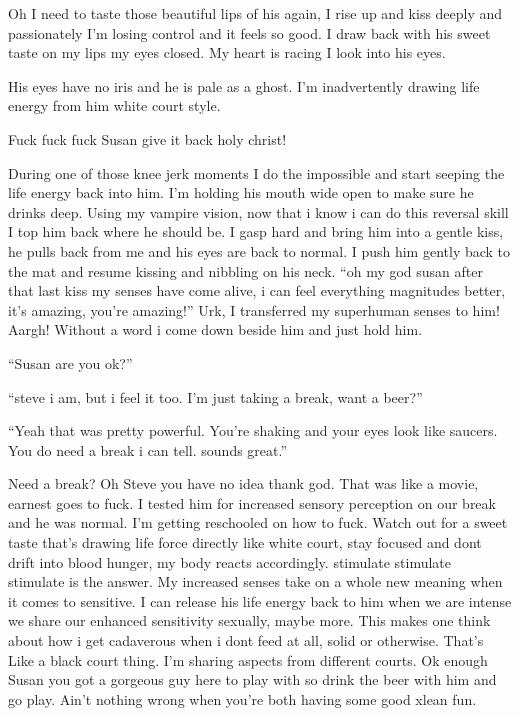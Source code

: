 Oh I need to taste those beautiful lips of his again, I rise up and kiss deeply and passionately I'm losing control and it feels so good. I draw back with his sweet taste on my lips my eyes closed. My heart is racing I look into his eyes. 

His eyes have no iris and he is pale as a ghost. I'm inadvertently drawing life energy from him white court style. 

Fuck fuck fuck Susan give it back holy christ! 

During one of those knee jerk moments I do the impossible and start seeping the life energy back into him. I'm holding his mouth wide open to make sure he drinks deep. Using my vampire vision, now that i know i can do this reversal skill I top him back where he should be. I gasp hard and bring him into a gentle kiss, he pulls back from me and his eyes are back to normal. I push him gently back to the mat and resume kissing and nibbling on his neck. ``oh my god susan after that last kiss my senses have come alive, i can feel everything magnitudes better, it's amazing, you're amazing!'' Urk, I transferred my superhuman senses to him! Aargh! Without a word i come down beside him and just hold him. 

``Susan are you ok?''

``steve i am, but i feel it too. I'm just taking a break, want a beer?''

``Yeah that was pretty powerful. You're shaking and your eyes look like saucers. You do need a break i can tell. sounds great.''

Need a break? Oh Steve you have no idea thank god. That was like a movie, earnest goes to fuck. I tested him for increased sensory perception on our break and he was normal. I'm getting reschooled on how to fuck. Watch out for a sweet taste that's drawing life force directly like white court, stay focused and dont drift into blood hunger, my body reacts accordingly. stimulate stimulate stimulate is the answer. My increased senses take on a whole new meaning when it comes to sensitive. I can release his life energy back to him when we are intense we share our enhanced sensitivity sexually, maybe more. This makes one think about how i get cadaverous when i dont feed at all, solid or otherwise. That's Like a black court thing. I'm sharing aspects from different courts. Ok enough Susan you got a gorgeous guy here to play with so drink the beer with him and go play. Ain't nothing wrong when you're both having some good xlean fun.

